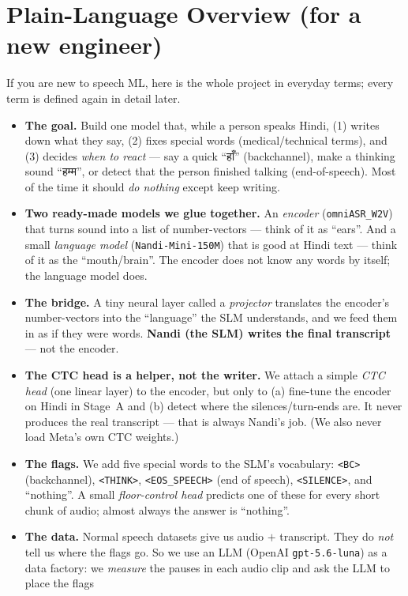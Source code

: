 \documentclass[11pt]{article}
\newcommand{\code}[1]{\texttt{#1}}
\newcommand{\flag}[1]{\texttt{<#1>}}
\begin{document}
\section{Plain-Language Overview (for a new engineer)}
If you are new to speech ML, here is the whole project in everyday terms; every term is
defined again in detail later.
\begin{itemize}[leftmargin=1.4em,itemsep=1pt]
\item \textbf{The goal.} Build one model that, while a person speaks Hindi, (1) writes down
what they say, (2) fixes special words (medical/technical terms), and (3) decides \emph{when
to react} --- say a quick ``\deva हाँ'' (backchannel), make a thinking sound ``\deva हम्म'',
or detect that the person finished talking (end-of-speech). Most of the time it should
\emph{do nothing} except keep writing.
\item \textbf{Two ready-made models we glue together.} An \emph{encoder} (\code{omniASR\_W2V})
that turns sound into a list of number-vectors --- think of it as ``ears''. And a small
\emph{language model} (\code{Nandi-Mini-150M}) that is good at Hindi text --- think of it as
the ``mouth/brain''. The encoder does not know any words by itself; the language model does.
\item \textbf{The bridge.} A tiny neural layer called a \emph{projector} translates the
encoder's number-vectors into the ``language'' the SLM understands, and we feed them in as if
they were words. \textbf{Nandi (the SLM) writes the final transcript} --- not the encoder.
\item \textbf{The CTC head is a helper, not the writer.} We attach a simple \emph{CTC head}
(one linear layer) to the encoder, but only to (a) fine-tune the encoder on Hindi in Stage~A
and (b) detect where the silences/turn-ends are. It never produces the real transcript ---
that is always Nandi's job. (We also never load Meta's own CTC weights.)
\item \textbf{The flags.} We add five special words to the SLM's vocabulary:
\flag{BC} (backchannel), \flag{THINK}, \flag{EOS\_SPEECH} (end of speech), \flag{SILENCE},
and ``nothing''. A small \emph{floor-control head} predicts one of these for every short chunk
of audio; almost always the answer is ``nothing''.
\item \textbf{The data.} Normal speech datasets give us audio $+$ transcript. They do
\emph{not} tell us where the flags go. So we use an LLM (OpenAI \code{gpt-5.6-luna}) as a data
factory: we \emph{measure} the pauses in each audio clip and ask the LLM to place the flags

\end{itemize}
\end{document}
